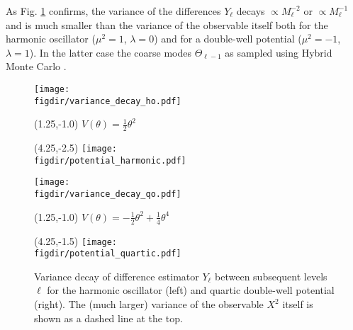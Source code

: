\documentclass[11pt]{article}
\newcommand{\figdir}{./figures/}
\begin{document}
As Fig. \ref{fig:quantum_results} confirms, the variance of the differences $Y_\ell$ decays $\propto M_\ell^{-2}$ or $\propto M_\ell^{-1}$ and is much smaller than the variance of the observable itself both for the harmonic oscillator ($\mu^2=1$, $\lambda=0$) and for a double-well potential ($\mu^2=-1$, $\lambda=1$). In the latter case the coarse modes $\Theta_{\ell-1}$ as sampled using Hybrid Monte Carlo \cite{Duane1987}.
\begin{figure}
  \begin{center}
  \begin{minipage}{0.45\linewidth}
    \texttt{[image: \\figdir/variance\_decay\_ho.pdf]}
    \begin{textblock}{4.0}(1.25,-1.0)
      $V(\theta)=\frac{1}{2}\theta^2$
    \end{textblock}
    \begin{textblock}{4.0}(4.25,-2.5)
      \texttt{[image: \\figdir/potential\_harmonic.pdf]}
    \end{textblock}
  \end{minipage}
  \hfill
  \begin{minipage}{0.45\linewidth}
    \texttt{[image: \\figdir/variance\_decay\_qo.pdf]}
    \begin{textblock}{4.0}(1.25,-1.0)
      $V(\theta)=-\frac{1}{2}\theta^2+\frac{1}{4}\theta^4$
    \end{textblock}
    \begin{textblock}{4.0}(4.25,-1.5)
      \texttt{[image: \\figdir/potential\_quartic.pdf]}
    \end{textblock}
  \end{minipage}
  \caption{Variance decay of difference estimator $Y_\ell$ between subsequent levels $\ell$ for the harmonic oscillator (left) and quartic double-well potential (right). The (much larger) variance of the observable $X^2$ itself is shown as a dashed line at the top.}
  \label{fig:quantum_results}
  \end{center}
\end{figure}
\end{document}
